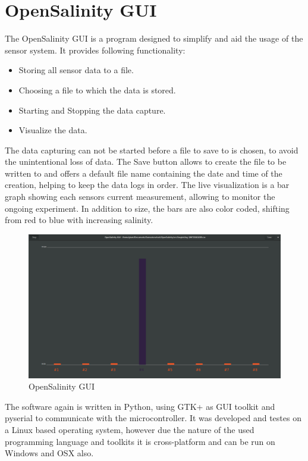\section{OpenSalinity GUI}

The OpenSalinity GUI is a program designed to simplify and aid the usage of the sensor system. It provides following functionality:

\begin{itemize}
	\item Storing all sensor data to a file.
	\item Choosing a file to which the data is stored.
	\item Starting and Stopping the data capture.
	\item Visualize the data.
\end{itemize}

The data capturing can not be started before a file to save to is chosen, to avoid the unintentional loss of data. The Save button allows to create the file to be written to and offers a default file name containing the date and time of the creation, helping to keep the data logs in order.
The live visualization is a bar graph showing each sensors current measurement, allowing to monitor the ongoing experiment. In addition to size, the bars are also color coded, shifting from red to blue with increasing salinity.\\

\begin{figure}[H]
	\begin{center}
		\includegraphics[width=\textwidth]{images/UI.png}
		\caption{OpenSalinity GUI}
		\label{fig:opamp}
	\end{center}
\end{figure}

The software again is written in Python, using GTK+ as GUI toolkit and pyserial to communicate with the microcontroller. It was developed and testes on a Linux based operating system, however due the nature of the used programming language and toolkits it is cross-platform and can be run on Windows and OSX also.\\

